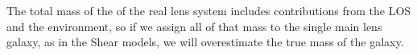 The total mass of the of the real lens system includes contributions from the LOS and the environment, so if we assign all of that mass to the single main lens galaxy, as in the Shear models, we will overestimate the true mass of the galaxy.